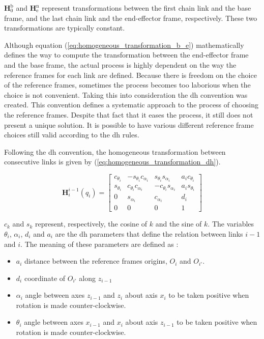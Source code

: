 $\boldsymbol{H}^{\text{b}}_{\text{0}}$ and $\boldsymbol{H}^{\text{n}}_{\text{e}}$ represent transformations between the first chain link and the base frame, and the last chain link and the end-effector frame, respectively. These two transformations are typically constant.

Although equation (\ref{eq:homogeneous_transformation_b_e}) mathematically defines the way to compute the transformation between the end-effector frame and the base frame, the actual process is highly dependent on the way the reference frames for each link are defined. Because there is freedom on the choice of the reference frames, sometimes the process becomes too laborious when the choice is not convenient. Taking this into consideration the \gls{dh} convention was created. This convention defines a systematic approach to the process of choosing the reference frames. Despite that fact that it eases the process, it still does not present a unique solution. It is possible to have various different reference frame choices still valid according to the \gls{dh} rules.

Following the \gls{dh} convention, the homogeneous transformation between consecutive links is given by (\ref{eq:homogeneous_transformation_dh}).

\begin{equation}
    \label{eq:homogeneous_transformation_dh}
    \boldsymbol{H}^{i-1}_{i}(q_i) = \begin{bmatrix}
        c_{\theta_i} & -s_{\theta_i}c_{\alpha_i} & s_{\theta_i}s_{\alpha_i} & a_{i}c_{\theta_i}\\
        s_{\theta_i} & c_{\theta_i}c_{\alpha_i} & -c_{\theta_i}s_{\alpha_i} & a_{i}s_{\theta_i}\\
        0 & s_{\alpha_i} & c_{\alpha_i} & d_{i}\\
        0 & 0 & 0 & 1
    \end{bmatrix}
\end{equation}

$c_k$ and $s_k$ represent, respectively, the cosine of $k$ and the sine of $k$. The variables $\theta_i$, $\alpha_i$, $d_i$ and $a_i$ are the \gls{dh} parameters that define the relation between links $i-1$ and $i$. The meaning of these parameters are defined as \cite{Siciliano2009_robotics_modelling_planning_control}:

\begin{itemize}
    \item $a_i$ distance between the reference frames origins, $O_i$ and $O_{i'}$.
    \item $d_i$ coordinate of $O_{i'}$ along $z_{i-1}$
    \item $\alpha_i$ angle between axes $z_{i-1}$ and $z_i$ about axis $x_i$ to be taken positive when rotation is made counter-clockwise.
    \item $\theta_i$ angle between axes $x_{i-1}$ and $x_i$ about axis $z_{i-1}$ to be taken positive when rotation is made counter-clockwise.
\end{itemize}

